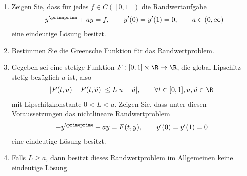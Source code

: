 \begin{exercise}
\leavevmode \\
\begin{enumerate}[label = \textbf{\alph*)}]
  \item Zeigen Sie, dass für jedes $f \in C([0,1])$ die Randwertaufgabe
  \begin{align*}
    -y^{\primeprime} + ay = f, \qquad y^{\prime}(0) = y^{\prime}(1) = 0, \qquad a \in (0,\infty)
  \end{align*}
  eine eindeutige Lösung besitzt.
  \item Bestimmen Sie die Greensche Funktion für das Randwertproblem.
  \item Gegeben sei eine stetige Funktion $F: [0,1] \times \R \to \R$, die
  global Lipschitz-stetig bezüglich $u$ ist, also
  \begin{align*}
    |F(t,u) - F(t,\widetilde{u})| \leq L|u - \widetilde{u}|, \qquad
    \forall t \in [0,1], u , \widetilde{u} \in \R
  \end{align*}
  mit Lipschitzkonstante $0 < L < a$. Zeigen Sie, dass unter diesen Voraussetzungen
  das nichtlineare Randwertproblem
  \begin{align*}
    -y^{\primeprime} + ay = F(t,y), \qquad y^{\prime}(0) = y^{\prime}(1) = 0
  \end{align*}
  eine eindeutige Lösung besitzt.
  \item Falls $L \geq a$, dann besitzt dieses Randwertproblem im Allgemeinen keine
  eindeutige Lösung.
\end{enumerate}
\end{exercise}
